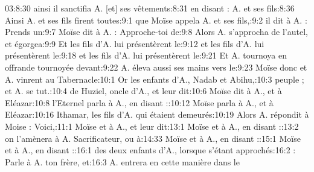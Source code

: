 \begin{multicols}{3}
{03:8:30	ainsi il sanctifia A. [et] ses vêtements:8:31	en disant : A. et ses fils:8:36	Ainsi A. et ses fils firent toutes:9:1	que Moïse appela A. et ses fils,:9:2	il dit à A. : Prends un:9:7	Moïse dit à A. : Approche-toi de:9:8	Alors A. s'approcha de l'autel, et égorgea:9:9	Et les fils d'A. lui présentèrent le:9:12	et les fils d'A. lui présentèrent le:9:18	et les fils d'A. lui présentèrent le:9:21	Et A. tournoya en offrande tournoyée devant:9:22	A. éleva aussi ses mains vers le:9:23	Moïse donc et A. vinrent au Tabernacle:10:1	Or les enfants d'A., Nadab et Abihu,:10:3	peuple ; et A. se tut.:10:4	de Huziel, oncle d'A., et leur dit:10:6	Moïse dit à A., et à Eléazar:10:8	l'Eternel parla à A., en disant ::10:12	Moïse parla à A., et à Eléazar:10:16	Ithamar, les fils d'A. qui étaient demeurés:10:19	Alors A. répondit à Moise : Voici,:11:1	Moïse et à A., et leur dit:13:1	Moïse et à A., en disant ::13:2	on l'amènera à A. Sacrificateur, ou à:14:33	Moïse et à A., en disant ::15:1	Moïse et à A., en disant ::16:1	des deux enfants d'A., lorsque s'étant approchés:16:2	: Parle à A. ton frère, et:16:3	A. entrera en cette manière dans le\newline
}
\end{multicols}
